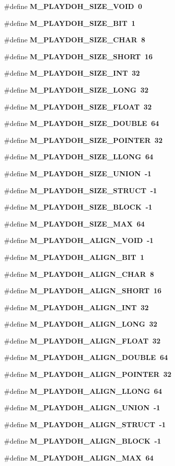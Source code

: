 \begin{CompactItemize}
\item 
\#define \bf{M\_\-PLAYDOH\_\-SIZE\_\-VOID}~0
\item 
\#define \bf{M\_\-PLAYDOH\_\-SIZE\_\-BIT}~1
\item 
\#define \bf{M\_\-PLAYDOH\_\-SIZE\_\-CHAR}~8
\item 
\#define \bf{M\_\-PLAYDOH\_\-SIZE\_\-SHORT}~16
\item 
\#define \bf{M\_\-PLAYDOH\_\-SIZE\_\-INT}~32
\item 
\#define \bf{M\_\-PLAYDOH\_\-SIZE\_\-LONG}~32
\item 
\#define \bf{M\_\-PLAYDOH\_\-SIZE\_\-FLOAT}~32
\item 
\#define \bf{M\_\-PLAYDOH\_\-SIZE\_\-DOUBLE}~64
\item 
\#define \bf{M\_\-PLAYDOH\_\-SIZE\_\-POINTER}~32
\item 
\#define \bf{M\_\-PLAYDOH\_\-SIZE\_\-LLONG}~64
\item 
\#define \bf{M\_\-PLAYDOH\_\-SIZE\_\-UNION}~-1
\item 
\#define \bf{M\_\-PLAYDOH\_\-SIZE\_\-STRUCT}~-1
\item 
\#define \bf{M\_\-PLAYDOH\_\-SIZE\_\-BLOCK}~-1
\item 
\#define \bf{M\_\-PLAYDOH\_\-SIZE\_\-MAX}~64
\item 
\#define \bf{M\_\-PLAYDOH\_\-ALIGN\_\-VOID}~-1
\item 
\#define \bf{M\_\-PLAYDOH\_\-ALIGN\_\-BIT}~1
\item 
\#define \bf{M\_\-PLAYDOH\_\-ALIGN\_\-CHAR}~8
\item 
\#define \bf{M\_\-PLAYDOH\_\-ALIGN\_\-SHORT}~16
\item 
\#define \bf{M\_\-PLAYDOH\_\-ALIGN\_\-INT}~32
\item 
\#define \bf{M\_\-PLAYDOH\_\-ALIGN\_\-LONG}~32
\item 
\#define \bf{M\_\-PLAYDOH\_\-ALIGN\_\-FLOAT}~32
\item 
\#define \bf{M\_\-PLAYDOH\_\-ALIGN\_\-DOUBLE}~64
\item 
\#define \bf{M\_\-PLAYDOH\_\-ALIGN\_\-POINTER}~32
\item 
\#define \bf{M\_\-PLAYDOH\_\-ALIGN\_\-LLONG}~64
\item 
\#define \bf{M\_\-PLAYDOH\_\-ALIGN\_\-UNION}~-1
\item 
\#define \bf{M\_\-PLAYDOH\_\-ALIGN\_\-STRUCT}~-1
\item 
\#define \bf{M\_\-PLAYDOH\_\-ALIGN\_\-BLOCK}~-1
\item 
\#define \bf{M\_\-PLAYDOH\_\-ALIGN\_\-MAX}~64
\end{CompactItemize}
